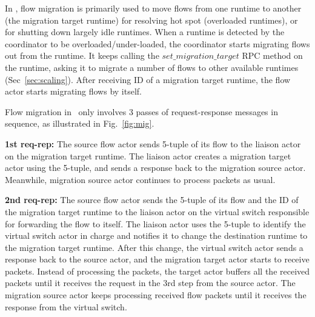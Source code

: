 In \nfactor, flow migration is primarily used to move flows from one runtime to another (the migration target runtime) for resolving hot spot (overloaded runtimes), or for shutting down largely idle runtimes. When a runtime is detected by the coordinator to be overloaded/under-loaded, the coordinator starts migrating flows out from the runtime. It keeps calling the $set\_migration\_target$ RPC method on the runtime, asking it to migrate a number of flows to other available runtimes (Sec~\ref{sec:scaling}). %
 After receiving ID of a migration target runtime, the flow actor starts migrating flows by itself. %


Flow migration in \nfactor~only involves 3 passes of request-response messages in sequence, as illustrated in Fig.~\ref{fig:mig}.



\textbf{1st req-rep:} The source flow actor sends 5-tuple of its flow to the liaison actor on the migration target runtime. The liaison actor creates a migration target actor using the 5-tuple, and sends a response back to the migration source actor. Meanwhile, migration source actor continues to process packets as usual.

\textbf{2nd req-rep:} The source flow actor sends the 5-tuple of its flow and the ID of the migration target runtime to the liaison actor on the virtual switch responsible for forwarding the flow to itself. The liaison actor uses the 5-tuple to identify the virtual switch actor in charge and notifies it to change the destination runtime to the migration target runtime. After this change, the virtual switch actor sends a response back to the source actor, and the migration target actor starts to receive packets. Instead of processing the packets, the target actor buffers all the received packets until it receives the request in the 3rd step from the source actor. The migration source actor keeps processing received flow packets until it receives the response from the virtual switch.

